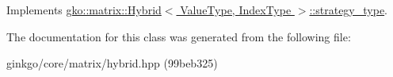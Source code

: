Implements \hyperlink{classgko_1_1matrix_1_1Hybrid_1_1strategy__type_a0a0cd4024f27c7d0f286f35fc0a6de60}{gko\+::matrix\+::\+Hybrid$<$ Value\+Type, Index\+Type $>$\+::strategy\+\_\+type}.



The documentation for this class was generated from the following file\+:\begin{DoxyCompactItemize}
\item 
ginkgo/core/matrix/hybrid.\+hpp (99beb325)\end{DoxyCompactItemize}
